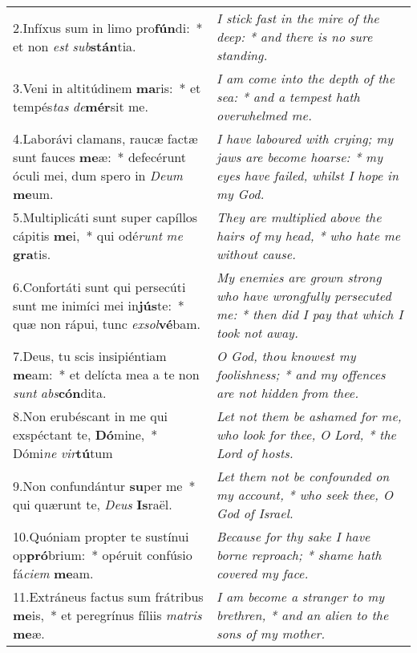\begin{longtable}{@{\hskip0pt} p{9.5cm} | p{6.5cm} @{\hskip0pt}}
2.\enspace Infíxus sum in limo pro\textbf{fún}di:~* et non \textit{est} \textit{sub}\textbf{stán}tia.
 & \textit{\small I stick fast in the mire of the deep: * and there is no sure standing.
}\\
3.\enspace Veni in altitúdinem \textbf{ma}ris:~* et tempés\textit{tas} \textit{de}\textbf{mér}sit me.
 & \textit{\small I am come into the depth of the sea: * and a tempest hath overwhelmed me.
}\\
4.\enspace Laborávi clamans, raucæ factæ sunt fauces \textbf{me}æ:~* defecérunt óculi mei, dum spero in \textit{De}\textit{um} \textbf{me}um.
 & \textit{\small I have laboured with crying; my jaws are become hoarse: * my eyes have failed, whilst I hope in my God.
}\\
5.\enspace Multiplicáti sunt super capíllos cápitis \textbf{me}i,~* qui odé\textit{runt} \textit{me} \textbf{gra}tis.
 & \textit{\small They are multiplied above the hairs of my head, * who hate me without cause.
}\\
6.\enspace Confortáti sunt qui persecúti sunt me inimíci mei in\textbf{jús}te:~* quæ non rápui, tunc \textit{ex}\textit{sol}\textbf{vé}bam.
 & \textit{\small My enemies are grown strong who have wrongfully persecuted me: * then did I pay that which I took not away.
}\\
7.\enspace Deus, tu scis insipiéntiam \textbf{me}am:~* et delícta mea a te non \textit{sunt} \textit{abs}\textbf{cón}dita.
 & \textit{\small O God, thou knowest my foolishness; * and my offences are not hidden from thee.
}\\
8.\enspace Non erubéscant in me qui exspéctant te, \textbf{Dó}mine,~* Dómi\textit{ne} \textit{vir}\textbf{tú}tum
 & \textit{\small Let not them be ashamed for me, who look for thee, O Lord, * the Lord of hosts.
}\\
9.\enspace Non confundántur \textbf{su}per me~* qui quærunt te, \textit{De}\textit{us} \textbf{Is}raël.
 & \textit{\small Let them not be confounded on my account, * who seek thee, O God of Israel.
}\\
10.\enspace Quóniam propter te sustínui op\textbf{pró}brium:~* opéruit confúsio fá\textit{ci}\textit{em} \textbf{me}am.
 & \textit{\small Because for thy sake I have borne reproach; * shame hath covered my face.
}\\
11.\enspace Extráneus factus sum frátribus \textbf{me}is,~* et peregrínus fíliis \textit{ma}\textit{tris} \textbf{me}æ.
 & \textit{\small I am become a stranger to my brethren, * and an alien to the sons of my mother.
}
\end{longtable}
